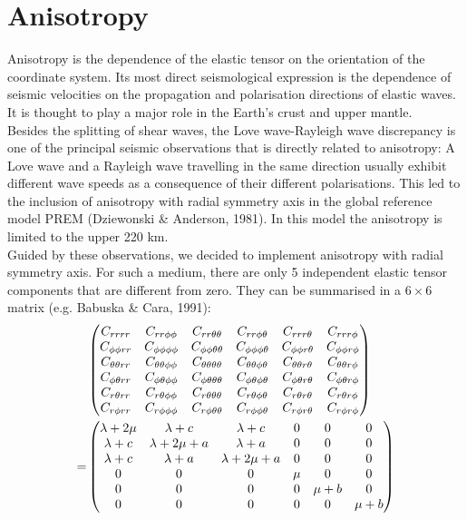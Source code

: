 \section{Anisotropy}\label{S:anisotropy} 
Anisotropy is the dependence of the elastic tensor on the orientation of the
coordinate system. Its most direct seismological expression is the
dependence of seismic velocities on the propagation and polarisation
directions of elastic waves. It is thought to play a major role in the Earth's crust and upper mantle.\\
Besides the splitting of shear waves, the Love wave-Rayleigh wave
discrepancy is one of the principal seismic observations that is
directly related to anisotropy: A Love wave and a Rayleigh wave
travelling in the same direction usually exhibit different wave
speeds as a consequence of their different polarisations. This led
to the inclusion of anisotropy with radial symmetry axis in the
global reference model PREM (Dziewonski \& Anderson, 1981). In this
model the anisotropy
is limited to the upper 220 km.\\
Guided by these observations, we decided to implement anisotropy
with radial symmetry axis. For such a medium, there are only 5
independent elastic tensor components that are different from zero.
They can be summarised in a $6\times 6$ matrix (e.g. Babuska \& Cara, 1991):
\begin{align}\label{E:setup15}
&\begin{pmatrix}
C_{r r r r} & C_{r r \phi \phi} & C_{r r \theta \theta} & C_{r r \phi \theta} & C_{r r r \theta} & C_{r r r \phi} \\
C_{\phi \phi r r} & C_{\phi \phi \phi \phi} & C_{\phi \phi \theta \theta} & C_{\phi \phi \phi \theta} & C_{\phi \phi r \theta} & C_{\phi \phi r \phi} \\
C_{\theta \theta r r} & C_{\theta \theta \phi \phi} & C_{\theta \theta \theta \theta} & C_{\theta \theta \phi \theta} & C_{\theta \theta r \theta} & C_{\theta \theta r \phi} \\
C_{\phi \theta r r} & C_{\phi \theta \phi \phi} & C_{\phi \theta \theta \theta} & C_{\phi \theta \phi \theta} & C_{\phi \theta r \theta} & C_{\phi \theta r \phi} \\
C_{r \theta r r} & C_{r \theta \phi \phi} & C_{r \theta \theta \theta} & C_{r \theta \phi \theta} & C_{r \theta r \theta} & C_{r \theta r \phi} \\
C_{r \phi r r} & C_{r \phi \phi \phi} & C_{r \phi \theta \theta} &
C_{r \phi \phi \theta} & C_{r \phi r \theta} & C_{r \phi r \phi}
\end{pmatrix}\notag\\
=&
\begin{pmatrix}
\lambda+2\mu & \lambda+c & \lambda+c & 0 & 0 & 0 \\
\lambda+c & \lambda+2\mu+a & \lambda+a & 0 & 0 & 0 \\
\lambda+c & \lambda+a & \lambda+2\mu+a & 0 & 0 & 0 \\
0 & 0 & 0 & \mu & 0 & 0 \\
0 & 0 & 0 & 0 & \mu+b & 0 \\
0 & 0 & 0 & 0 & 0 & \mu+b
\end{pmatrix}
\end{align}
